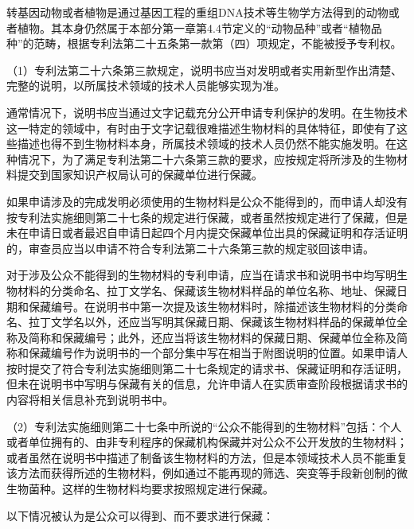 转基因动物或者植物是通过基因工程的重组DNA技术等生物学方法得到的动物或者植物。其本身仍然属于本部分第一章第4.4节定义的“动物品种”或者“植物品种”的范畴，根据专利法第二十五条第一款第（四）项规定，不能被授予专利权。

{\setlength{\parindent}{17.1bp}（1）专利法第二十六条第三款规定，说明书应当对发明或者实用新型作出清楚、完整的说明，以所属技术领域的技术人员能够实现为准。\par}

通常情况下，说明书应当通过文字记载充分公开申请专利保护的发明。在生物技术这一特定的领域中，有时由于文字记载很难描述生物材料的具体特征，即使有了这些描述也得不到生物材料本身，所属技术领域的技术人员仍然不能实施发明。在这种情况下，为了满足专利法第二十六条第三款的要求，应按规定将所涉及的生物材料提交到国家知识产权局认可的保藏单位进行保藏。

如果申请涉及的完成发明必须使用的生物材料是公众不能得到的，而申请人却没有按专利法实施细则第二十七条的规定进行保藏，或者虽然按规定进行了保藏，但是未在申请日或者最迟自申请日起四个月内提交保藏单位出具的保藏证明和存活证明的，审查员应当以申请不符合专利法第二十六条第三款的规定驳回该申请。

对于涉及公众不能得到的生物材料的专利申请，应当在请求书和说明书中均写明生物材料的分类命名、拉丁文学名、保藏该生物材料样品的单位名称、地址、保藏日期和保藏编号。在说明书中第一次提及该生物材料时，除描述该生物材料的分类命名、拉丁文学名以外，还应当写明其保藏日期、保藏该生物材料样品的保藏单位全称及简称和保藏编号；此外，还应当将该生物材料的保藏日期、保藏单位全称及简称和保藏编号作为说明书的一个部分集中写在相当于附图说明的位置。如果申请人按时提交了符合专利法实施细则第二十七条规定的请求书、保藏证明和存活证明，但未在说明书中写明与保藏有关的信息，允许申请人在实质审查阶段根据请求书的内容将相关信息补充到说明书中。

{\setlength{\parindent}{17.1bp}（2）专利法实施细则第二十七条中所说的“公众不能得到的生物材料”包括：个人或者单位拥有的、由非专利程序的保藏机构保藏并对公众不公开发放的生物材料；或者虽然在说明书中描述了制备该生物材料的方法，但是本领域技术人员不能重复该方法而获得所述的生物材料，例如通过不能再现的筛选、突变等手段新创制的微生物菌种。这样的生物材料均要求按照规定进行保藏。\par}

以下情况被认为是公众可以得到、而不要求进行保藏：

